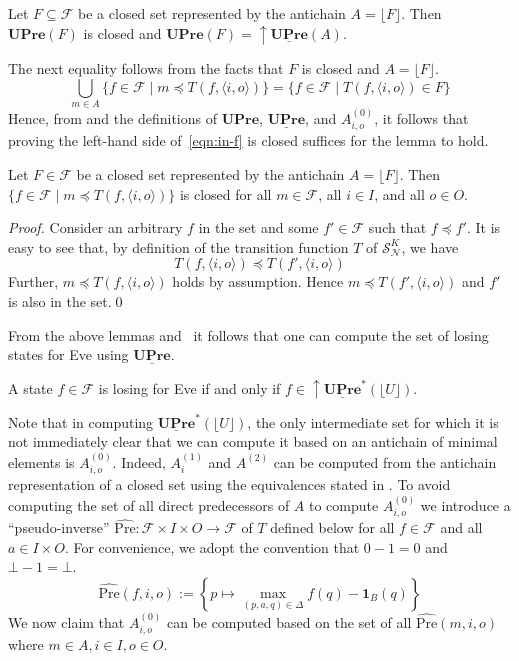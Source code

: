 \documentclass[runningheads,a4paper,draft]{llncs}
\newcommand{\indicator}[2]{\mathbf{1}_{#1}(#2)}
\newcommand{\upre}{\mathbf{UPre}}
\newcommand{\eve}{Eve\xspace}
\newcommand{\calF}{\mathcal{F}}
\newcommand{\calN}{\mathcal{N}}
\newcommand{\calS}{\mathcal{S}}
\newcommand{\closeup}[1]{\mathrm{\uparrow} #1}
\newcommand{\pseudopre}{\widehat{\mathrm{Pre}}}
\begin{document}
\begin{lemma}\label{lem:uupre}
  Let $F \subseteq \calF$ be a closed set represented by the antichain $A =
  \lfloor F \rfloor$. Then $\upre(F)$ is closed and
  \(
    \upre(F) = \closeup{\underline{\upre}(A)}.
  \)
\end{lemma}
The next equality follows from the facts that
$F$ is closed and $A = \lfloor F \rfloor$.
\begin{equation}\label{eqn:in-f}
  \bigcup_{m \in A} \{ f \in \calF \mid m \preceq T(f, \langle i,o \rangle)
  \}
  =
  \{f \in \calF \mid T(f,\langle i, o \rangle) \in F\}
\end{equation}
Hence, from  and the definitions of $\upre$,
$\underline{\upre}$, and $A^{(0)}_{i,o}$, it follows that proving
the left-hand side of~\eqref{eqn:in-f} is closed suffices for the lemma to
hold.
\begin{lemma}\label{lem:closed-pre}
  Let $F \in \calF$ be a closed set represented by the antichain $A = \lfloor
  F \rfloor$. Then $\{f \in \calF \mid m \preceq T(f, \langle i,o \rangle) \}$
  is closed for all $m \in \calF$, all $i \in I$, and all $o \in O$.
\end{lemma}
\begin{proof}
  Consider an arbitrary $f$ in the set and some $f' \in \calF$ such that $f
  \preceq f'$. It is easy to see that, by definition of the transition
  function $T$ of $\calS^K_\calN$, we have 
  \[ 
    T(f,\langle i, o \rangle) \preceq T(f',\langle i, o \rangle)
  \]
  Further, $m \preceq T(f,\langle i, o \rangle)$ holds by assumption. Hence
  \(m \preceq T(f', \langle i, o \rangle)\) and $f'$ is also in the set.\qed
\end{proof}

From the above lemmas and~ it follows that one can compute the set of
losing states for \eve using $\underline{\upre}$.
\begin{theorem}
  A state $f \in \calF$ is losing for \eve if and only if $f \in
  \closeup{\underline{\upre}^*(\lfloor U \rfloor)}$.
\end{theorem}

Note that in computing $\underline{\upre}^*(\lfloor U \rfloor)$, the only
intermediate set for which it is not immediately clear that we can compute it
based on an antichain of minimal elements is $A^{(0)}_{i,o}$. Indeed,
$A^{(1)}_i$ and $A^{(2)}$ can be computed from the antichain representation of
a closed set using the equivalences stated in . To avoid
computing the set of all direct predecessors of $A$ to compute $A^{(0)}_{i,o}$
we introduce a ``pseudo-inverse'' $\pseudopre : \calF \times I \times O \to
\calF$ of $T$ defined below for all $f \in \calF$ and all $a \in I \times
O$. For convenience, we adopt the convention that $0 - 1 = 0$ and
$\bot - 1 = \bot$.
\[
  \pseudopre(f,i,o) := \left\{ p \mapsto \max_{(p,a,q) \in \Delta} f(q) -
  \indicator{B}{q} \right\}
\]
We now claim that $A^{(0)}_{i,o}$ can be computed based on the set of all
$\pseudopre(m,i,o)$ where $m \in A, i \in I, o \in O$.
\end{document}
